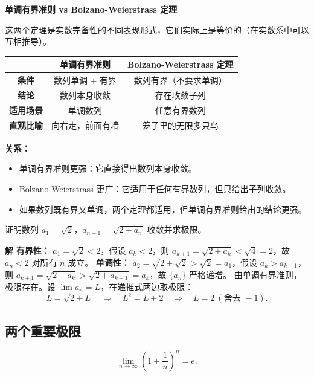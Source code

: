 \documentclass[fontset=fandol]{ctexart}
\newenvironment{custom}[1]{\par\noindent\textbf{#1}\quad}{\par\vspace{0.8em}}
\begin{document}
\begin{custom}{单调有界准则 vs Bolzano-Weierstrass 定理}

这两个定理是实数完备性的不同表现形式，它们实际上是等价的（在实数系中可以互相推导）。

\begin{tabular}{|c|c|c|}
\hline
 & \textbf{单调有界准则} & \textbf{Bolzano-Weierstrass 定理} \\
\hline
\textbf{条件} & 数列单调 + 有界 & 数列有界（不要求单调） \\
\hline
\textbf{结论} & 数列本身收敛 & 存在收敛子列 \\
\hline
\textbf{适用场景} & 单调数列 & 任意有界数列 \\
\hline
\textbf{直观比喻} & 向右走，前面有墙 & 笼子里的无限多只鸟 \\
\hline
\end{tabular}

\textbf{关系：}
\begin{itemize}
\item 单调有界准则更强：它直接得出数列本身收敛。
\item Bolzano-Weierstrass 更广：它适用于任何有界数列，但只给出子列收敛。
\item 如果数列既有界又单调，两个定理都适用，但单调有界准则给出的结论更强。
\end{itemize}

\end{custom}


\begin{example}[重要例子]
证明数列 \(a_1 = \sqrt{2}\)，\(a_{n+1} = \sqrt{2 + a_n}\) 收敛并求极限。
\end{example}
\begin{custom}{解}
\textbf{有界性：} \(a_1 = \sqrt{2} < 2\)，假设 \(a_k < 2\)，则 \(a_{k+1} = \sqrt{2 + a_k} < \sqrt{4} = 2\)，故 \(a_n < 2\) 对所有 \(n\) 成立。
\textbf{单调性：} \(a_2 = \sqrt{2+\sqrt{2}} > \sqrt{2} = a_1\)，假设 \(a_k > a_{k-1}\)，则 \(a_{k+1} = \sqrt{2 + a_k} > \sqrt{2 + a_{k-1}} = a_k\)，故 \(\{a_n\}\) 严格递增。
由单调有界准则，极限存在。设 \(\lim a_n = L\)，在递推式两边取极限：
\[
L = \sqrt{2 + L} \quad\Longrightarrow\quad L^2 = L + 2 \quad\Longrightarrow\quad L = 2\ (\text{舍去 } -1).
\]
\end{custom}

\subsection{两个重要极限}

\begin{theorem}[第一个重要极限]
\[
\lim_{n\to\infty} \left(1 + \dfrac{1}{n}\right)^n = e.
\]
\end{theorem}
\end{document}
